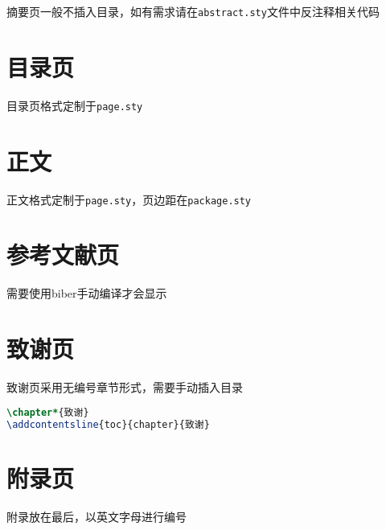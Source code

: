 摘要页一般不插入目录，如有需求请在\texttt{abstract.sty}文件中反注释相关代码

\section{目录页}

目录页格式定制于\texttt{page.sty}

\section{正文}

正文格式定制于\texttt{page.sty}，页边距在\texttt{package.sty}

\section{参考文献页}

需要使用biber手动编译才会显示

\section{致谢页}

致谢页采用无编号章节形式，需要手动插入目录
\begin{lstlisting}[language=TeX]
\chapter*{致谢}
\addcontentsline{toc}{chapter}{致谢}
\end{lstlisting}

\section{附录页}

附录放在最后，以英文字母进行编号
